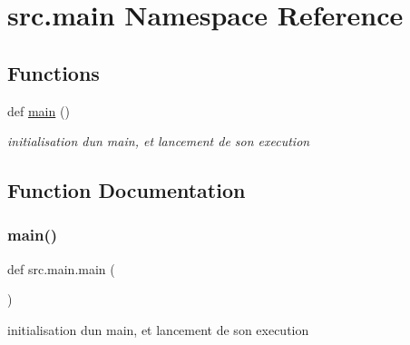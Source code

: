 \hypertarget{namespacesrc_1_1main}{}\section{src.\+main Namespace Reference}
\label{namespacesrc_1_1main}
\subsection*{Functions}
\begin{DoxyCompactItemize}
\item 
def \hyperlink{namespacesrc_1_1main_aa2ef3f8da6c115803462ed4b1529ad94}{main} ()
\begin{DoxyCompactList}\small\item\em initialisation d\textquotesingle{}un main, et lancement de son execution \end{DoxyCompactList}\end{DoxyCompactItemize}


\subsection{Function Documentation}
\mbox{\label{namespacesrc_1_1main_aa2ef3f8da6c115803462ed4b1529ad94}} 
\subsubsection{\texorpdfstring{main()}{main()}}
{\footnotesize\ttfamily def src.\+main.\+main (\begin{DoxyParamCaption}{ }\end{DoxyParamCaption})}



initialisation d\textquotesingle{}un main, et lancement de son execution 

